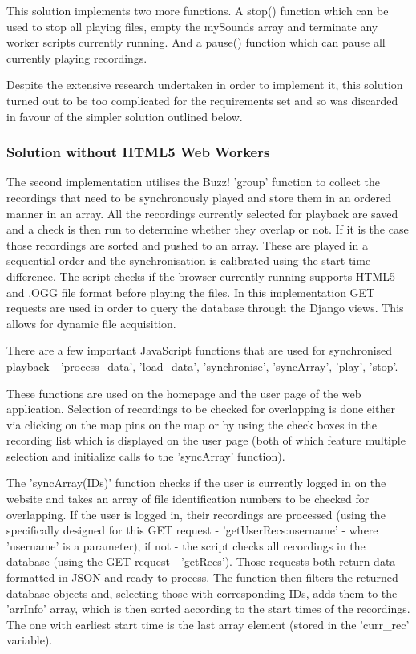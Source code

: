 \documentclass{l3proj}
\begin{document}
This solution implements two more functions. A stop() function which can be used to stop all playing files, empty the mySounds array and terminate any worker scripts currently running. And a pause() function which can pause all currently playing recordings.

Despite the extensive research undertaken in order to implement it, this solution turned out to be too complicated for the requirements set and so was discarded in favour of the simpler solution outlined below.

\subsubsection{Solution without HTML5 Web Workers}
The second implementation utilises the Buzz! 'group' function to collect the recordings that need to be synchronously played and store them in an ordered manner in an array. All the recordings currently selected for playback are saved and a check is then run to determine whether they overlap or not. If it is the case those recordings are sorted and pushed to an array. These are played in a sequential order and the synchronisation is calibrated using the start time difference. The script checks if the browser currently running supports HTML5  and .OGG file format before playing the files. In this implementation GET requests are used in order to query the database through the \gls{Django} views. This allows for dynamic file acquisition.

There are a few important \gls{JavaScript} functions that are used for synchronised playback - 'process\_data', 'load\_data', 'synchronise', 'syncArray', 'play', 'stop'.

These functions are used on the homepage and the user page of the web application. Selection of recordings to be checked for overlapping is done either via clicking on the map pins on the map or by using the check boxes in the recording list which is displayed on the user page (both of which feature multiple selection and initialize calls to the 'syncArray' function).

The 'syncArray(IDs)' function checks if the user is currently logged in on the website and takes an array of file identification numbers to be checked for overlapping. If the user is logged in, their recordings are processed (using the specifically designed for this GET request - 'getUserRecs:username' - where 'username' is a parameter), if not - the script checks all recordings in the database (using the GET request - 'getRecs'). Those requests both return data formatted in JSON and ready to process. The function then filters the returned database objects and, selecting those with corresponding IDs, adds them to the 'arrInfo' array, which is then sorted according to the start times of the recordings. The one with earliest start time is the last array element (stored in the 'curr_rec' variable).
\end{document}
